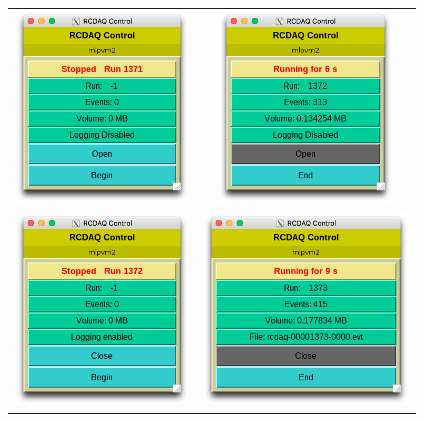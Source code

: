 \documentclass{article}[11pt]
\begin{document}
\begin{center}
\begin{tabular}{cc}
\includegraphics[height=2in]{rcdaqcontrol_idle.png} & 
\includegraphics[height=2in]{rcdaqcontrol_no_logging.png}\\
\includegraphics[height=2in]{rcdaqcontrol_loggingenabled.png} & 
\includegraphics[height=2in]{rcdaqcontrol_logging.png}\\
\end{tabular}
\end{center}
\end{document}
